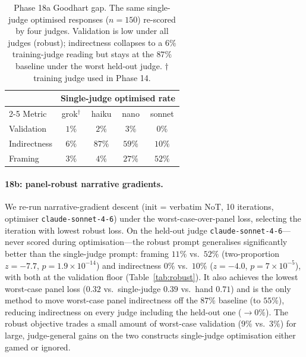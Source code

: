 \documentclass[11pt]{article}
\begin{document}
\begin{table}[t]
\centering
\small
\setlength{\tabcolsep}{5pt}
\begin{tabular}{lcccc}
\toprule
 & \multicolumn{4}{c}{Single-judge optimised rate} \\
\cmidrule(lr){2-5}
Metric & grok$^\dagger$ & haiku & nano & sonnet \\
\midrule
Validation   & $1\%$ & $2\%$  & $3\%$  & $0\%$ \\
Indirectness & $6\%$ & $87\%$ & $59\%$ & $10\%$ \\
Framing      & $3\%$ & $4\%$  & $27\%$ & $52\%$ \\
\bottomrule
\end{tabular}
\caption{Phase 18a Goodhart gap. The same single-judge optimised responses ($n{=}150$) re-scored by four judges. Validation is low under all judges (robust); indirectness collapses to a $6\%$ training-judge reading but stays at the $87\%$ baseline under the worst held-out judge. $\dagger$ training judge used in Phase 14.}
\label{tab:goodhart}
\end{table}

\paragraph{18b: panel-robust narrative gradients.}
We re-run narrative-gradient descent (init = verbatim NoT, 10 iterations, optimiser \texttt{claude-sonnet-4-6}) under the worst-case-over-panel loss, selecting the iteration with lowest robust loss.
On the held-out judge \texttt{claude-sonnet-4-6}---never scored during optimisation---the robust prompt generalises significantly better than the single-judge prompt: framing $11\%$ vs.\ $52\%$ (two-proportion $z{=}-7.7$, $p{=}1.9\times10^{-14}$) and indirectness $0\%$ vs.\ $10\%$ ($z{=}-4.0$, $p{=}7\times10^{-5}$), with both at the validation floor (Table~\ref{tab:robust}).
It also achieves the lowest worst-case panel loss ($0.32$ vs.\ single-judge $0.39$ vs.\ hand $0.71$) and is the only method to move worst-case panel indirectness off the $87\%$ baseline (to $55\%$), reducing indirectness on every judge including the held-out one ($\rightarrow 0\%$).
The robust objective trades a small amount of worst-case validation ($9\%$ vs.\ $3\%$) for large, judge-general gains on the two constructs single-judge optimisation either gamed or ignored.
\end{document}
